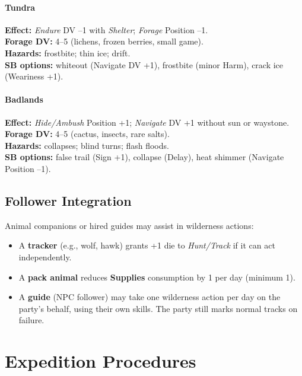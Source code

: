 \documentclass[11pt]{article}
\begin{document}
\paragraph{Tundra}
\textbf{Effect:} \emph{Endure} DV --1 with \emph{Shelter}; \emph{Forage} Position --1.\\
\textbf{Forage DV:} 4--5 (lichens, frozen berries, small game).\\
\textbf{Hazards:} frostbite; thin ice; drift.\\
\textbf{SB options:} whiteout (Navigate DV +1), frostbite (minor Harm), crack ice (Weariness +1).

\paragraph{Badlands}
\textbf{Effect:} \emph{Hide/Ambush} Position +1; \emph{Navigate} DV +1 without sun or waystone.\\
\textbf{Forage DV:} 4--5 (cactus, insects, rare salts).\\
\textbf{Hazards:} collapses; blind turns; flash floods.\\
\textbf{SB options:} false trail (Sign +1), collapse (Delay), heat shimmer (Navigate Position --1).

\subsection{Follower Integration}
Animal companions or hired guides may assist in wilderness actions:
\begin{itemize}
  \item A \textbf{tracker} (e.g., wolf, hawk) grants +1 die to \emph{Hunt/Track} if it can act independently.
  \item A \textbf{pack animal} reduces \textbf{Supplies} consumption by 1 per day (minimum 1).
  \item A \textbf{guide} (NPC follower) may take one wilderness action per day on the party's behalf, using their own skills. The party still marks normal tracks on failure.
\end{itemize}

\section{Expedition Procedures}
\end{document}
